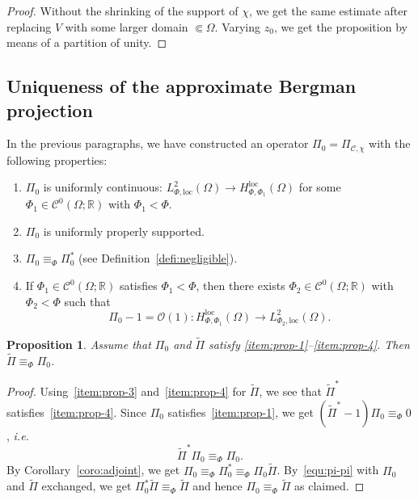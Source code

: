 \documentclass{article}
\newtheorem{prop}[theo]{Proposition}
\newcommand{\loc}{\mathrm{loc}}
\newcommand{\RM}{\mathbb{R}}
\begin{document}
\begin{proof}
  Without the shrinking of the support of $\chi $, we get the same
  estimate after replacing $V$ with some larger domain
  $\Subset \Omega $. Varying $z_0$, we get the proposition by means of
  a partition of unity.
\end{proof}

\subsection{Uniqueness of the approximate Bergman projection}
\label{sec:uniq-appr-bergm}

In the previous paragraphs, we have constructed an operator
$\Pi_0=\Pi_{\mathcal{C}, \chi}$ with the following properties:

\begin{enumerate}%
\item \label{item:prop-1} $\Pi_0$ is uniformly continuous:
  $ L_{ \Phi,\loc}^{2}(\Omega) \to H^\loc_{\Phi,\Phi_1}(\Omega)$ for
  some $\Phi_1\in\mathscr{C}^0(\Omega;\RM)$ with $\Phi_1<\Phi$.
\item $\Pi_0$ is uniformly properly supported.
\item \label{item:prop-3} $\Pi_0\equiv_\Phi \Pi_0^*$ (see
  Definition~\ref{defi:negligible}).
\item \label{item:prop-4} If $\Phi_1\in\mathscr{C}^0(\Omega;\RM)$
  satisfies $\Phi_1<\Phi$, then there exists
  $\Phi_2\in\mathscr{C}^0(\Omega;\RM)$ with $\Phi_2<\Phi$ such that
  \[
  \Pi_0 - 1 = \mathcal{O}(1): H^\loc_{\Phi,\Phi_1}(\Omega) \to L_{
    \Phi_2,\loc}^{2}(\Omega).
  \]
\end{enumerate}

\begin{prop}
  \label{prop:uniqueness}
  Assume that $\Pi_0$ and $\tilde\Pi$ satisfy
  \ref{item:prop-1}--\ref{item:prop-4}. Then $\tilde\Pi\equiv_\Phi\Pi_0$.
\end{prop}
\begin{proof}
  Using~\ref{item:prop-3} and~\ref{item:prop-4} for $\tilde{\Pi}$, we
  see that $\tilde\Pi^*$ satisfies~\ref{item:prop-4}. Since $\Pi_0$
  satisfies~\ref{item:prop-1}, we get $(\tilde\Pi^*-1)\Pi_0\equiv_\Phi 0$,
  \emph{i.e.}
  \begin{equation}
    \label{equ:pi-pi}
    \tilde\Pi^* \Pi_0 \equiv_\Phi \Pi_0.
  \end{equation}
  By Corollary~\ref{coro:adjoint}, we get
  $\Pi_0\equiv_\Phi \Pi_0^* \equiv_\Phi \Pi_0\tilde\Pi$. By~\eqref{equ:pi-pi}
  with $\Pi_0$ and $\tilde\Pi$ exchanged, we get
  $\Pi_0^* \tilde \Pi \equiv_\Phi \tilde\Pi$ and hence
  $\Pi_0\equiv_\Phi\tilde\Pi$ as claimed.
\end{proof}
\end{document}
